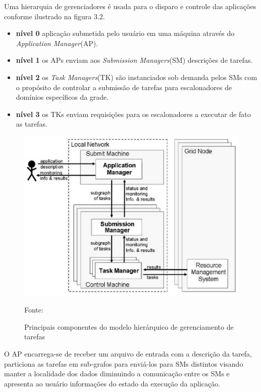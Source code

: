 Uma hierarquia de gerenciadores é usada para o disparo e controle das aplicações conforme ilustrado na figura 3.2.

\begin{itemize}
	\item \textbf{nível 0} aplicação submetida pelo usuário em uma máquina através do \emph{Application Manager}(AP).
	\item \textbf{nível 1} os APs enviam aos \emph{Submission Managers}(SM) descrições de tarefas.
	\item \textbf{nível 2} os \emph{Task Managers}(TK) são instanciados sob demanda pelos SMs com o propósito de controlar a submissão de tarefas para escalonadores de domínios específicos da grade.
	\item \textbf{nível 3} os TKs enviam requisições para os escalonadores a executar de fato as tarefas.
\end{itemize}

\begin{figure}[htb]
\begin{center}
\includegraphics[scale=0.7]{./img/grand.eps}
\caption{Principais componentes do modelo hierárquico de gerenciamento de tarefas}
\label{fig:Modelo_Grand}
Fonte: \cite{Mangan2006}
\end{center}
\end{figure}

O AP encarrega-se de receber um arquivo de entrada com a descrição da tarefa, particiona as tarefas em sub-grafos para enviá-los para SMs distintos visando manter a localidade dos dados diminuindo a comunicação entre os SMs e apresenta ao usuário informações do estado da execução da aplicação.

